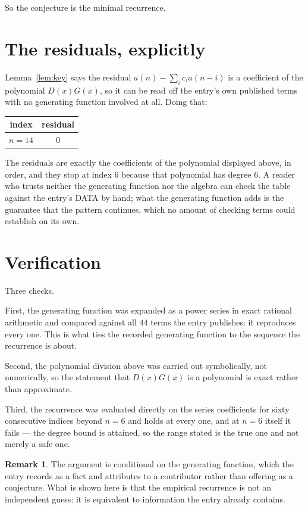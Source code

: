 \documentclass[11pt,a4paper]{article}
\theoremstyle{plain}
\theoremstyle{definition}
\newtheorem{remark}[theorem]{Remark}
\begin{document}
So the conjecture is the minimal recurrence.

\section{The residuals, explicitly}

Lemma~\ref{lem:key} says the residual $a(n)-\sum_ic_ia(n-i)$ is a coefficient of the
polynomial $D(x)G(x)$, so it can be read off the entry's own published terms with no
generating function involved at all. Doing that:
\begin{center}
\begin{tabular}{cc}
index & residual \\ \hline
$n=14$ & $0$
\end{tabular}
\end{center}
The residuals are exactly the coefficients of the polynomial displayed above, in order, and
they stop at index $6$ because that polynomial has degree $6$. A reader who trusts
neither the generating function nor the algebra can check the table against the entry's DATA
by hand; what the generating function adds is the guarantee that the pattern continues, which
no amount of checking terms could establish on its own.

\section{Verification}

Three checks.

First, the generating function was expanded as a power series in exact rational arithmetic and
compared against all $44$ terms the entry publishes: it reproduces every one. This is
what ties the recorded generating function to the sequence the recurrence is about.

Second, the polynomial division above was carried out symbolically, not numerically, so the
statement that $D(x)G(x)$ is a polynomial is exact rather than approximate.

Third, the recurrence was evaluated directly on the series coefficients for sixty consecutive
indices beyond $n=6$ and holds at every one, and at $n=6$ itself it fails --- the
degree bound is attained, so the range stated is the true one and not merely a safe one.

\begin{remark}
The argument is conditional on the generating function, which the entry records as a fact and
attributes to a contributor rather than offering as a conjecture. What is shown here is that
the empirical recurrence is not an independent guess: it is equivalent to information the
entry already contains.
\end{remark}
\end{document}
